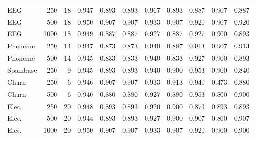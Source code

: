 \begin{tabular}{lrrrrrrrrrr}
EEG & 250 & 18 & 0.947 & 0.893 & 0.893 & 0.967 & 0.893 & 0.887 & 0.907 & 0.887 \\
EEG & 500 & 18 & 0.950 & 0.907 & 0.907 & 0.933 & 0.907 & 0.920 & 0.907 & 0.920 \\
EEG & 1000 & 18 & 0.949 & 0.887 & 0.887 & 0.927 & 0.887 & 0.927 & 0.900 & 0.893 \\
Phoneme & 250 & 14 & 0.947 & 0.873 & 0.873 & 0.940 & 0.887 & 0.913 & 0.907 & 0.913 \\
Phoneme & 500 & 14 & 0.945 & 0.833 & 0.833 & 0.940 & 0.833 & 0.927 & 0.900 & 0.893 \\
Spambase & 250 & 9 & 0.945 & 0.893 & 0.893 & 0.940 & 0.900 & 0.953 & 0.900 & 0.840 \\
Churn & 250 & 6 & 0.946 & 0.907 & 0.907 & 0.933 & 0.913 & 0.940 & 0.473 & 0.880 \\
Churn & 500 & 6 & 0.940 & 0.880 & 0.880 & 0.927 & 0.880 & 0.953 & 0.800 & 0.900 \\
Elec. & 250 & 20 & 0.948 & 0.893 & 0.893 & 0.920 & 0.900 & 0.873 & 0.893 & 0.893 \\
Elec. & 500 & 20 & 0.944 & 0.893 & 0.893 & 0.927 & 0.900 & 0.907 & 0.860 & 0.907 \\
Elec. & 1000 & 20 & 0.950 & 0.907 & 0.907 & 0.933 & 0.907 & 0.920 & 0.900 & 0.900 \\
\bottomrule
\end{tabular}
